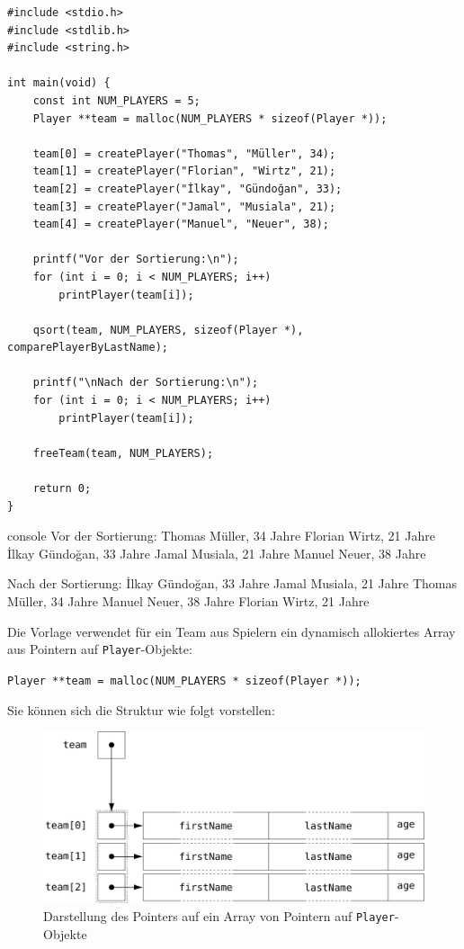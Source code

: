\Vorlage
\begin{verbatim}
#include <stdio.h>
#include <stdlib.h>
#include <string.h>

int main(void) {
    const int NUM_PLAYERS = 5;
    Player **team = malloc(NUM_PLAYERS * sizeof(Player *));

    team[0] = createPlayer("Thomas", "Müller", 34);
    team[1] = createPlayer("Florian", "Wirtz", 21);
    team[2] = createPlayer("İlkay", "Gündoğan", 33);
    team[3] = createPlayer("Jamal", "Musiala", 21);
    team[4] = createPlayer("Manuel", "Neuer", 38);

    printf("Vor der Sortierung:\n");
    for (int i = 0; i < NUM_PLAYERS; i++)
        printPlayer(team[i]);

    qsort(team, NUM_PLAYERS, sizeof(Player *), comparePlayerByLastName);

    printf("\nNach der Sortierung:\n");
    for (int i = 0; i < NUM_PLAYERS; i++)
        printPlayer(team[i]);

    freeTeam(team, NUM_PLAYERS);

    return 0;
}
\end{verbatim}

\begin{mybox}[Bildschirmausgabe]{console}
Vor der Sortierung:
Thomas Müller, 34 Jahre
Florian Wirtz, 21 Jahre
İlkay Gündoğan, 33 Jahre
Jamal Musiala, 21 Jahre
Manuel Neuer, 38 Jahre

Nach der Sortierung:
İlkay Gündoğan, 33 Jahre
Jamal Musiala, 21 Jahre
Thomas Müller, 34 Jahre
Manuel Neuer, 38 Jahre
Florian Wirtz, 21 Jahre
\end{mybox}

Die Vorlage verwendet für ein Team aus Spielern ein dynamisch allokiertes Array
aus Pointern auf \texttt{Player}-Objekte:

\noindent\texttt{Player **team = malloc(NUM_PLAYERS * sizeof(Player *));}

Sie können sich die Struktur wie folgt vorstellen:

\begin{figure}[htb!]
    \centering
    \includegraphics[scale=0.7]{images/sortPlayers.pdf}
    \caption{Darstellung des Pointers auf ein Array von Pointern auf
    \texttt{Player}-Objekte}
    \label{fig:sortPlayer}
\end{figure}

